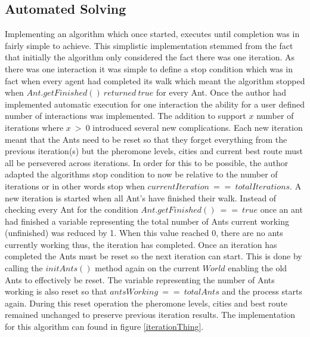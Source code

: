 \subsection{Automated Solving}
\label{autoSolve}
Implementing an algorithm which once started, executes until completion was in fairly simple to achieve. This simplistic implementation stemmed from the fact that initially the algorithm only considered the fact there was one iteration. As there was one interaction it was simple to define a stop condition which was in fact when every agent had completed its walk which meant the algorithm stopped when $Ant.getFinished()\ returned\ true$ for every Ant. Once the author had implemented automatic execution for one interaction the ability for a user defined number of interactions was implemented. The addition to support $x$ number of iterations where $x\ >\ 0$ introduced several new complications. Each new iteration meant that the Ants need to be reset so that they forget everything from the previous iteration(s) but the pheromone levels, cities and current best route must all be persevered across iterations. In order for this to be possible, the author adapted the algorithms stop condition to now be relative to the number of iterations or in other words stop when $currentIteration\ ==\ totalIterations$. A new iteration is started when all Ant's have finished their walk. Instead of checking every Ant for the condition $Ant.getFinished()\ ==\ true$ once an ant had finished a variable representing the total number of Ants current working (unfinished) was reduced by 1. When this value reached 0, there are no ants currently working thus, the iteration has completed. Once an iteration has completed the Ants must be reset so the next iteration can start. This is done by calling the $initAnts()$ method again on the current $World$ enabling the old Ants to effectively be reset. The variable representing the number of Ants working is also reset so that $antsWorking\ ==\ totalAnts$ and the process starts again. During this reset operation the pheromone levels, cities and best route remained unchanged to preserve previous iteration results. The implementation for this algorithm can found in figure \ref{iterationThing}.

